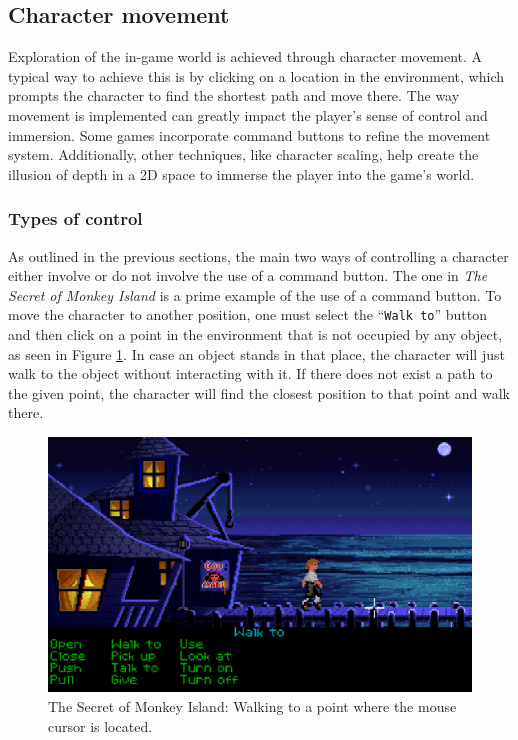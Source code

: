 \subsection{Character movement}
\label{sec:Character movement}
Exploration of the in-game world is achieved through character movement. A typical way to achieve this is by clicking on a location in the environment, which prompts the character to find the shortest path and move there. The way movement is implemented can greatly impact the player's sense of control and immersion. Some games incorporate command buttons to refine the movement system. Additionally, other techniques, like character scaling, help create the illusion of depth in a 2D space to immerse the player into the game's world.

\subsubsection{Types of control}
As outlined in the previous sections, the main two ways of controlling a character either involve or do not involve the use of a command button. The one in \textit{The Secret of Monkey Island} is a prime example of the use of a command button. To move the character to another position, one must select the “\texttt{Walk to}” button and then click on a point in the environment that is not occupied by any object, as seen in Figure \ref{fig:M-TSoMI-W}. In case an object stands in that place, the character will just walk to the object without interacting with it. If there does not exist a path to the given point, the character will find the closest position to that point and walk there.

\begin{figure}[H]
\centering
\includegraphics[width=.8\linewidth]{img/W-TSoMI.png}
\caption{The Secret of Monkey Island: Walking to a point where the mouse cursor is located.}
\label{fig:M-TSoMI-W}
\end{figure}

